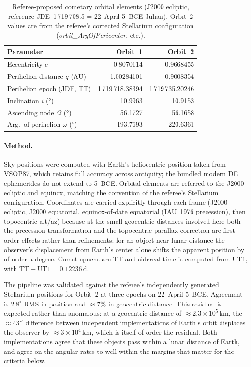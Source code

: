\documentclass[11pt,a4paper]{article}
\begin{document}
\begin{table}[h]
  \centering
  \caption{Referee-proposed cometary orbital elements (J2000 ecliptic,
  reference JDE~1\,719\,708.5 = 22~April 5~BCE Julian).
  Orbit~2 values are from the referee's corrected Stellarium configuration
  (\textit{orbit\_ArgOfPericenter}, etc.).}
  \label{tab:r2orbits}
  \small
  \begin{tabular}{@{}lrr@{}}
    \toprule
    Parameter & Orbit~1 & Orbit~2 \\
    \midrule
    Eccentricity $e$ & 0.8070114 & 0.9668455 \\
    Perihelion distance $q$ (AU) & 1.00284101 & 0.9008354 \\
    Perihelion epoch (JDE, TT) & 1\,719\,718.38394 & 1\,719\,735.20246 \\
    Inclination $i$ (°) & 10.9963 & 10.9153 \\
    Ascending node $\Omega$ (°) & 56.1727 & 56.1658 \\
    Arg.\ of perihelion $\omega$ (°) & 193.7693 & 220.6361 \\
    \bottomrule
  \end{tabular}
\end{table}

\paragraph{Method.}
Sky positions were computed with Earth's heliocentric position taken from
VSOP87, which retains full accuracy across antiquity; the bundled modern
DE ephemerides do not extend to 5~BCE.  Orbital elements are referred to
the J2000 ecliptic and equinox, matching the convention of the referee's
Stellarium\cite{stellarium2021} configuration.  Coordinates are carried
explicitly through each frame (J2000 ecliptic, J2000 equatorial,
equinox-of-date equatorial (IAU~1976 precession), then topocentric
alt/az) because at the small geocentric distances involved here both the
precession transformation and the topocentric parallax correction are
first-order effects rather than refinements: for an object near lunar
distance the observer's displacement from Earth's center alone shifts the
apparent position by of order a degree.  Comet epochs are TT and sidereal
time is computed from UT1, with $\mathrm{TT}-\mathrm{UT1}=0.12236$\,d.

The pipeline was validated against the referee's independently generated
Stellarium positions for Orbit~2 at three epochs on 22~April 5~BCE.
Agreement is $2.8^\circ$ RMS in position and ${\approx}7\%$ in geocentric
distance.  This residual is expected rather than anomalous: at a geocentric
distance of ${\approx}2.3\times10^{5}$\,km, the ${\approx}43''$ difference
between independent implementations of Earth's orbit displaces the observer
by ${\approx}3\times10^{4}$\,km, which is itself of order the residual.
Both implementations agree that these objects pass within a lunar distance
of Earth, and agree on the angular rates to well within the margins that
matter for the criteria below.
\end{document}
